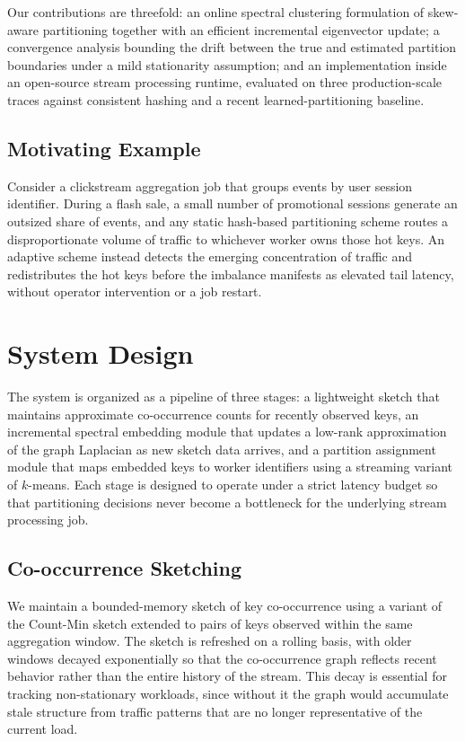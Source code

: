 \documentclass[10pt,twocolumn]{article}
\begin{document}
Our contributions are threefold: an online spectral clustering formulation
of skew-aware partitioning together with an efficient incremental
eigenvector update; a convergence analysis bounding the drift between the
true and estimated partition boundaries under a mild stationarity
assumption; and an implementation inside an open-source stream processing
runtime, evaluated on three production-scale traces against consistent
hashing and a recent learned-partitioning baseline.

\subsection{Motivating Example}
\label{sec:intro-example}
Consider a clickstream aggregation job that groups events by user session
identifier. During a flash sale, a small number of promotional sessions
generate an outsized share of events, and any static hash-based partitioning
scheme routes a disproportionate volume of traffic to whichever worker owns
those hot keys. An adaptive scheme instead detects the emerging
concentration of traffic and redistributes the hot keys before the
imbalance manifests as elevated tail latency, without operator
intervention or a job restart.

\section{System Design}
The system is organized as a pipeline of three stages: a lightweight sketch
that maintains approximate co-occurrence counts for recently observed keys,
an incremental spectral embedding module that updates a low-rank
approximation of the graph Laplacian as new sketch data arrives, and a
partition assignment module that maps embedded keys to worker identifiers
using a streaming variant of $k$-means. Each stage is designed to operate
under a strict latency budget so that partitioning decisions never become a
bottleneck for the underlying stream processing job.

\subsection{Co-occurrence Sketching}
We maintain a bounded-memory sketch of key co-occurrence using a variant of
the Count-Min sketch extended to pairs of keys observed within the same
aggregation window. The sketch is refreshed on a rolling basis, with older
windows decayed exponentially so that the co-occurrence graph reflects
recent behavior rather than the entire history of the stream. This decay is
essential for tracking non-stationary workloads, since without it the graph
would accumulate stale structure from traffic patterns that are no longer
representative of the current load.
\end{document}
